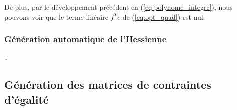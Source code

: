\documentclass{article}
\begin{document}
De plus, par le développement précédent en (\ref{eq:polynome_integre}), nous pouvons voir que le terme linéaire $f^Tc$ de (\ref{eq:opt_quad}) est nul.

\subsubsection{Génération automatique de l'Hessienne}

\ldots

\subsection{Génération des matrices de contraintes d'égalité}

%
%
\end{document}
